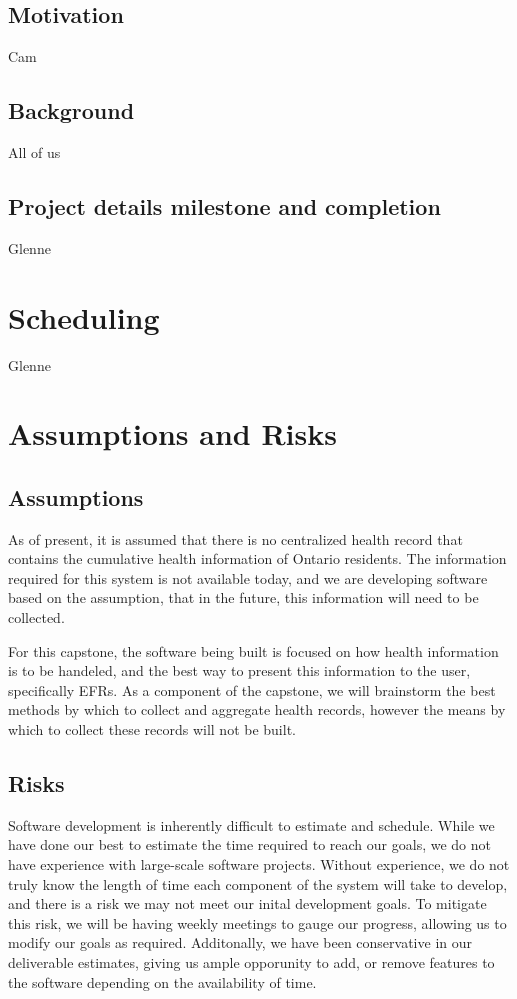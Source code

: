 \documentclass{article}
\begin{document}
\subsection{Motivation}
Cam
\subsection{Background}
All of us
\subsection{Project details milestone and completion}
Glenne
\section{Scheduling}
Glenne
\section{Assumptions and Risks}

\subsection{Assumptions}

As of present, it is assumed that there is no centralized health record that contains the cumulative health information of Ontario residents. The information required for this system is not available today, and we are developing software based on the assumption, that in the future, this information will need to be collected.

For this capstone, the software being built is focused on how health information is to be handeled, and the best way to present this information to the user, specifically EFRs. As a component of the capstone, we will brainstorm the best methods by which to collect and aggregate health records, however the means by which to collect these records will not be built.

\subsection{Risks}

Software development is inherently difficult to estimate and schedule. While we have done our best to estimate the time required to reach our goals, we do not have experience with large-scale software projects. Without experience, we do not truly know the length of time each component of the system will take to develop, and there is a risk we may not meet our inital development goals. To mitigate this risk, we will be having weekly meetings to gauge our progress, allowing us to modify our goals as required. Additonally, we have been conservative in our deliverable estimates, giving us ample opporunity to add, or remove features to the software depending on the availability of time.
\end{document}

